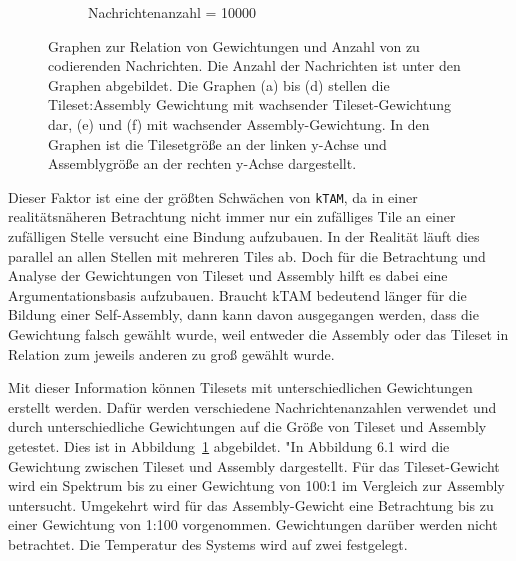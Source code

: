 \begin{figure}
\begin{subfigure}[b]{0.49\textwidth}
    \end{subfigure}
    \hfill
    \begin{subfigure}[b]{0.49\textwidth}
        \caption{Nachrichtenanzahl = 10000}
    \end{subfigure}
    \caption[Graphen zur Relation von Gewichtungen zur Nachrichtenmenge]{Graphen zur Relation von Gewichtungen und Anzahl von zu codierenden Nachrichten. Die Anzahl der Nachrichten ist unter den Graphen abgebildet. Die Graphen (a) bis (d) stellen die Tileset:Assembly Gewichtung mit wachsender Tileset-Gewichtung dar, (e) und (f) mit wachsender Assembly-Gewichtung. In den Graphen ist die Tilesetgröße an der linken y-Achse und Assemblygröße an der rechten y-Achse dargestellt.}
    \label{fig:eval_gewichtungen}
\end{figure}

Dieser Faktor ist eine der größten Schwächen von \texttt{kTAM}, da in einer realitätsnäheren Betrachtung nicht immer nur ein zufälliges Tile an einer zufälligen Stelle versucht eine Bindung aufzubauen. In der Realität läuft dies parallel an allen Stellen mit mehreren Tiles ab. Doch für die Betrachtung und Analyse der Gewichtungen von Tileset und Assembly hilft es dabei eine Argumentationsbasis aufzubauen. Braucht kTAM bedeutend länger für die Bildung einer Self-Assembly, dann kann davon ausgegangen werden, dass die Gewichtung falsch gewählt wurde, weil entweder die Assembly oder das Tileset in Relation zum jeweils anderen zu groß gewählt wurde. 

Mit dieser Information können Tilesets mit unterschiedlichen Gewichtungen erstellt werden. Dafür werden verschiedene Nachrichtenanzahlen verwendet und durch unterschiedliche Gewichtungen auf die Größe von Tileset und Assembly getestet. Dies ist in Abbildung~\ref{fig:eval_gewichtungen} abgebildet. "In Abbildung 6.1 wird die Gewichtung zwischen Tileset und Assembly dargestellt. Für das Tileset-Gewicht wird ein Spektrum bis zu einer Gewichtung von 100:1 im Vergleich zur Assembly untersucht. Umgekehrt wird für das Assembly-Gewicht eine Betrachtung bis zu einer Gewichtung von 1:100 vorgenommen. Gewichtungen darüber werden nicht betrachtet. Die Temperatur des Systems wird auf zwei festgelegt.


